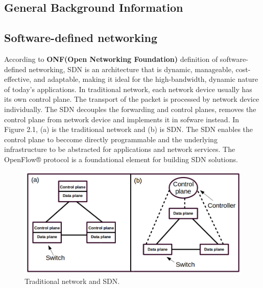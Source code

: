 \documentclass[a4paper,12pt]{report}
\begin{document}
\begin{CJK*}{UTF8}{bkai}
\begin{large}
  \chapter{General Background Information}
    \section{Software-defined networking}
      \qquad According to {\bf ONF(Open Networking Foundation)} \cite{ONF} definition of software-defined networking, SDN is 
                an architecture that is dynamic, manageable, cost-effective, and adaptable, making it ideal for the 
                high-bandwidth, dynamic nature of today’s applications. In traditional network, each network device 
                usually has its own control plane. The transport of the packet is processed by network device 
                individually. The SDN decouples the forwarding and control planes, removes the control plane from 
                network device and implements it in sofware instead. In Figure 2.1, (a) is the traditional network and (b) is SDN. The SDN enables the control plane to beccome 
                directly programmable and the underlying infrastructure to be abstracted for applications and network 
                services. The OpenFlow® protocol is a foundational element for building SDN solutions.
    \begin{figure}
          \caption{Traditional network and SDN.}
          \centering
            \includegraphics[width=1.0\textwidth]{tra_sdn.png}
        \end{figure}

\end{large}
\end{CJK*}
\end{document}
